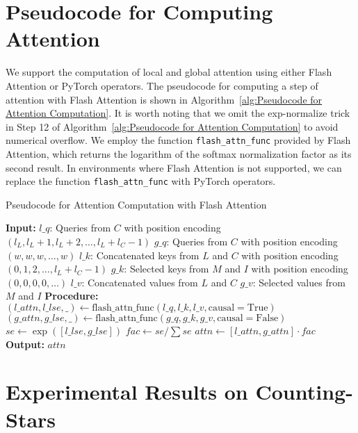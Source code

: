 \section{Pseudocode for Computing Attention}
\label{sec:pseudocode_attn}
We support the computation of local and global attention using either Flash Attention \citep{dao2205fast} or PyTorch operators. The pseudocode for computing a step of attention with Flash Attention is shown in Algorithm~\ref{alg:Pseudocode for Attention Computation}. It is worth noting that we omit the exp-normalize trick in Step 12 of Algorithm~\ref{alg:Pseudocode for Attention Computation} to avoid numerical overflow. We employ the function \texttt{flash\_attn\_func} provided by Flash Attention, which returns the logarithm of the softmax normalization factor as its second result. In environments where Flash Attention is not supported, we can replace the function \texttt{flash\_attn\_func} with PyTorch operators.
\begin{algorithm*} 
\caption{Pseudocode for Attention Computation with Flash Attention}
\begin{algorithmic}[1]
\State \textbf{Input:}
\State $l\_q$: Queries from $C$ with position encoding $(l_L, l_L+1, l_L+2, \ldots, l_L + l_C - 1)$
\State $g\_q$: Queries from $C$ with position encoding $(w, w, w, \ldots, w)$
\State $l\_k$: Concatenated keys from $L$ and $C$ with position encoding $(0, 1, 2, \ldots, l_L + l_C - 1)$
\State $g\_k$: Selected keys from $M$ and $I$ with position encoding $(0, 0, 0, 0, \ldots)$
\State $l\_v$: Concatenated values from $L$ and $C$
\State $g\_v$: Selected values from $M$ and $I$
\State
\State \textbf{Procedure:}
\State $(l\_attn, l\_lse, \_) \leftarrow \text{flash\_attn\_func}(l\_q, l\_k, l\_v, \mathrm{causal}=\mathrm{True})$
\State $(g\_attn, g\_lse, \_) \leftarrow \text{flash\_attn\_func}(g\_q, g\_k, g\_v, \mathrm{causal}=\mathrm{False})$
\State $se \leftarrow \exp([l\_lse, g\_lse])$
\State $fac \leftarrow se / \sum se$
\State $attn \leftarrow [l\_attn, g\_attn] \cdot fac$
\State
\State \textbf{Output:}
\State $attn$
\end{algorithmic}
\label{alg:Pseudocode for Attention Computation}
\end{algorithm*}


\section{Experimental Results on Counting-Stars}
\label{sec:Counting-Stars-Results}

%